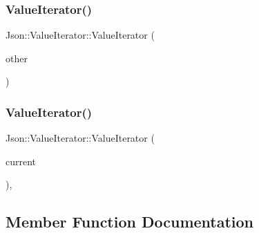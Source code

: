 \hypertarget{class_json_1_1_value_iterator_a7d5e58a9a4a553968acdf3064b39d21c}{}\label{class_json_1_1_value_iterator_a7d5e58a9a4a553968acdf3064b39d21c} 
\subsubsection{\texorpdfstring{Value\+Iterator()}{ValueIterator()}\hspace{0.1cm}{\footnotesize\ttfamily [7/8]}}
{\footnotesize\ttfamily Json\+::\+Value\+Iterator\+::\+Value\+Iterator (\begin{DoxyParamCaption}\item[{const \hyperlink{class_json_1_1_value_iterator}{Value\+Iterator} \&}]{other }\end{DoxyParamCaption})}

\hypertarget{class_json_1_1_value_iterator_afb06ea21add440c78c27dc49570460a5}{}\label{class_json_1_1_value_iterator_afb06ea21add440c78c27dc49570460a5} 
\subsubsection{\texorpdfstring{Value\+Iterator()}{ValueIterator()}\hspace{0.1cm}{\footnotesize\ttfamily [8/8]}}
{\footnotesize\ttfamily Json\+::\+Value\+Iterator\+::\+Value\+Iterator (\begin{DoxyParamCaption}\item[{const Value\+::\+Object\+Values\+::iterator \&}]{current }\end{DoxyParamCaption})\hspace{0.3cm}{\ttfamily [explicit]}, {\ttfamily [private]}}



\subsection{Member Function Documentation}
\hypertarget{class_json_1_1_value_iterator_a3be48b0c1729ec2532f1ff27ad465d32}{}\label{class_json_1_1_value_iterator_a3be48b0c1729ec2532f1ff27ad465d32} 

